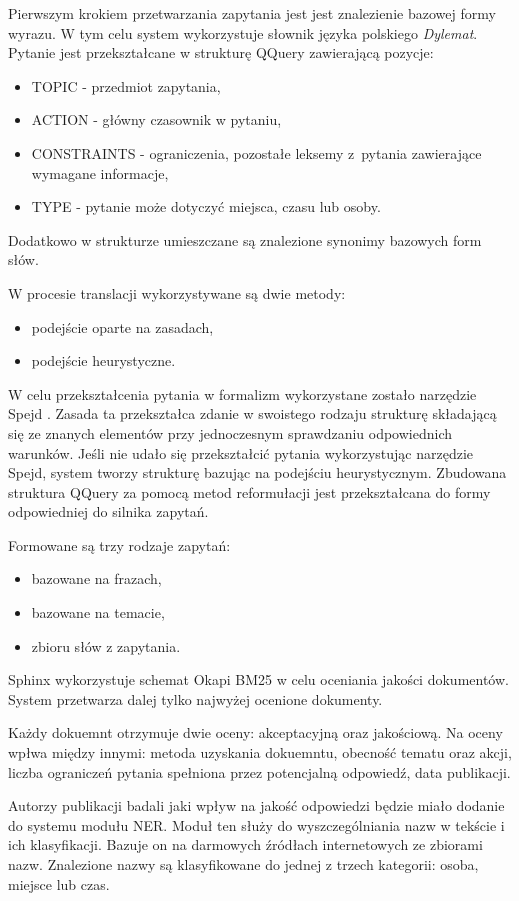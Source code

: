 Pierwszym krokiem przetwarzania zapytania jest jest znalezienie bazowej formy wyrazu. W tym celu system wykorzystuje słownik języka polskiego \textit{Dylemat}. Pytanie jest przekształcane w strukturę QQuery zawierającą pozycje:
\begin{itemize}
	\item TOPIC - przedmiot zapytania,
	\item ACTION - główny czasownik w pytaniu,
	\item CONSTRAINTS - ograniczenia, pozostałe leksemy z~pytania zawierające wymagane informacje,
	\item TYPE - pytanie może dotyczyć miejsca, czasu lub osoby.
\end{itemize}
Dodatkowo w strukturze umieszczane są znalezione synonimy bazowych form słów.

W procesie translacji wykorzystywane są dwie metody: 
\begin{itemize}
	\item podejście oparte na zasadach, 
	\item podejście heurystyczne.
\end{itemize}
W celu przekształcenia pytania w formalizm wykorzystane zostało narzędzie Spejd \cite{spejd}. Zasada ta przekształca zdanie w swoistego rodzaju strukturę składającą się ze znanych elementów przy jednoczesnym sprawdzaniu odpowiednich warunków. Jeśli nie udało się przekształcić pytania wykorzystując narzędzie Spejd, system tworzy strukturę bazując na podejściu heurystycznym. Zbudowana struktura QQuery za pomocą metod reformułacji jest przekształcana do formy odpowiedniej do silnika zapytań.

Formowane są trzy rodzaje zapytań:
\begin{itemize}
	\item bazowane na frazach,
	\item bazowane na temacie,
	\item zbioru słów z zapytania.
\end{itemize}

Sphinx wykorzystuje schemat Okapi BM25 w celu oceniania jakości dokumentów. System przetwarza dalej tylko najwyżej ocenione dokumenty.

Każdy dokuemnt otrzymuje dwie oceny: akceptacyjną oraz jakościową. Na oceny wpłwa między innymi: metoda uzyskania dokuemntu, obecność tematu oraz akcji, liczba ograniczeń pytania spełniona przez potencjalną odpowiedź, data publikacji.

Autorzy publikacji \cite{polishQAS} badali jaki wpływ na jakość odpowiedzi będzie miało dodanie do systemu modułu NER. Moduł ten służy do wyszczególniania nazw w tekście i ich klasyfikacji. Bazuje on na darmowych źródłach internetowych ze zbiorami nazw. Znalezione nazwy są klasyfikowane do jednej z trzech kategorii: osoba, miejsce lub czas.

